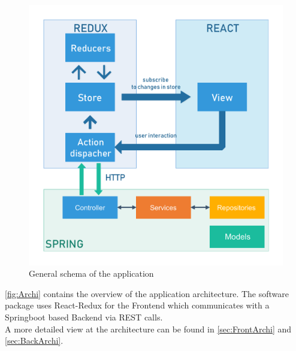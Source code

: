 \begin{figure}[H]
\centering
\includegraphics[]{uml/general.pdf} 
\caption{General schema of the application}
\label{fig:Archi}
\end{figure}

\autoref{fig:Archi} contains the overview of the application architecture. The software package uses React-Redux for the Frontend which communicates with a Springboot based Backend via REST calls.\\
A more detailed view at the architecture can be found in \autoref{sec:FrontArchi} and \autoref{sec:BackArchi}.